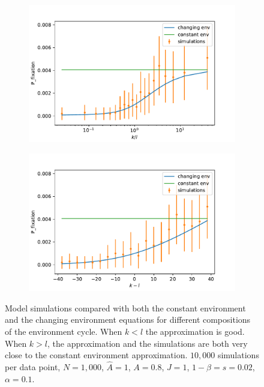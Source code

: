 \documentclass[11pt]{article}
\begin{document}
\begin{figure}[t]
  \begin{center}
  \begin{subfigure}[a]{0.49\linewidth}
  \caption{}
    \includegraphics[width=\linewidth]{../figures/changed_env/ch_env_var_k_div_l.pdf}
   \end{subfigure}
   \begin{subfigure}[a]{0.49\linewidth}
   \caption{}
    \includegraphics[width=\linewidth]{../figures/changed_env/ch_env_var_k_min_l.pdf}
   \end{subfigure}
  \end{center}
  \caption{Model simulations compared with both the constant environment and the changing environment equations for different compositions of the environment cycle. When $k<l$ the approximation is good. When $k>l$, the approximation and the simulations are both very close to the constant environment approximation. 
  $10,000$ simulations per data point, $N=1,000$, $\hat{A}=1$, $A=0.8$, $J=1$, $1-\beta=s=0.02$, $\alpha=0.1$.}
  \label{fig:ch_env_k_l}
\end{figure}
\end{document}
